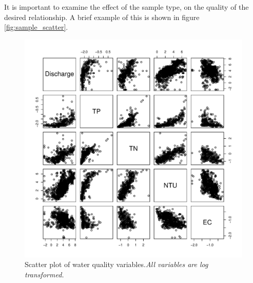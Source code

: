 \documentclass[5p]{elsarticle}
\begin{document}
It is important to examine the effect of the sample type, on the quality of the desired relationship. A brief example of this is shown in figure \ref{fig:sample_scatter}.


\begin{center}
\begin{figure}
\includegraphics[scale=0.50]{Scatterplotmatrix.pdf}
\caption{Scatter plot of water quality variables.\it{All variables are log transformed.}}
\label{fig:correlation_plots}
\end{figure}
\end{center}
\end{document}
